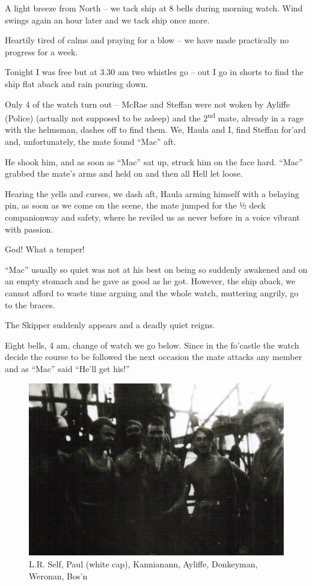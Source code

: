 \documentclass[
  11pt,
  msmallroyalvopaper
]{memoir}
\begin{document}
A light breeze from North -- we tack ship at 8 bells during morning
watch. Wind swings again an hour later and we tack ship once more.

Heartily tired of calms and praying for a blow -- we have made
practically no progress for a week.

Tonight I was free but at 3.30 am two whistles go -- out I go in shorts
to find the ship flat aback and rain pouring down.

Only 4 of the watch turn out -- McRae and Steffan were not woken by
Ayliffe (Police) (actually not supposed to be asleep) and the
2\textsuperscript{nd} mate, already in a rage with the helmsman, dashes
off to find them. We, Haula and I, find Steffan for'ard and,
unfortunately, the mate found ``Mac'' aft.

He shook him, and as soon as ``Mac'' sat up, struck him on the face
hard. ``Mac'' grabbed the mate's arms and held on and then all Hell let
loose.

Hearing the yells and curses, we dash aft, Haula arming himself with a
belaying pin, as soon as we come on the scene, the mate jumped for the ½
deck companionway and safety, where he reviled us as never before in a
voice vibrant with passion.

God! What a temper!

``Mac'' usually so quiet was not at his best on being so suddenly
awakened and on an empty stomach and he gave as good as he got. However,
the ship aback, we cannot afford to waste time arguing and the whole
watch, muttering angrily, go to the braces.

The Skipper suddenly appears and a deadly quiet reigns.

Eight bells, 4 am, change of watch we go below. Since in the fo'castle
the watch decide the course to be followed the next occasion the mate
attacks any member and as ``Mac'' said ``He'll get his!''

\begin{figure}
\centering
\includegraphics{./images/image029.png}
\caption{L.R. Self, Paul (white cap), Kannianann, Ayliffe, Donkeyman,
Weronan, Bos'n}
\end{figure}
\end{document}
